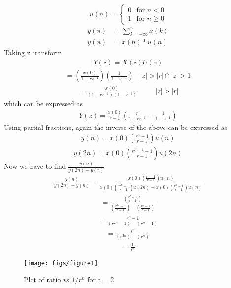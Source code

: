 \documentclass[journal,12pt,twocolumn]{IEEEtran}
\theoremstyle{remark}
\begin{document}
\[
u(n) = 
\begin{cases} 
0 & \text{for } n < 0 \\
1 & \text{for } n \geq 0 
\end{cases}
\]
\begin{align}
y(n) &= \sum_{k=-\infty}^{n} x(k) \\
y(n) &= x(n)*u(n)
\end{align}
Taking z transform
\begin{align}
Y(z) = X(z)U(z)
\end{align}
\begin{align}
= \left(\frac{x(0)}{1 - rz^{-1}}\right) \left(\frac{1}{1 - z^{-1}}\right)  \quad |z| > |r| \cap |z| > 1
\end{align}
\begin{align}
= \frac{x(0)}{(1 - rz^{-1})(1 - z^{-1})} && \quad |z| > |r|
\end{align}
which can be expressed as
\begin{align}
Y(z) = \frac{x(0)}{r-1} \left(\frac{r}{1-rz^{-1}} - \frac{1}{1-z^{-1}}\right)
\end{align}
Using partial fractions, again the inverse of the above can be expressed as 
\begin{align}
y(n) = x(0)\left(\frac{r^{n}-1}{r-1}\right)u(n)
\end{align}
\begin{align}
y(2n) = x(0)\left(\frac{r^{2n-1}-1}{r-1}\right)u(2n)
\end{align}
Now we have to find $\frac{y(n)}{y(2n)-y(n)}$
\begin{align}
\frac{y(n)}{y(2n)-y(n)} = \frac{x(0)\left(\frac{r^{n}-1}{r-1}\right)u(n)}{x(0)\left(\frac{r^{2n}-1}{r-1}\right)u(2n)- x(0)\left(\frac{r^{n}-1}{r-1}\right)u(n)}
\end{align}
\begin{align}
 = \frac{\left(\frac{r^{n}-1}{r-1}\right)}{\left(\frac{r^{2n}-1}{r-1}\right)- \left(\frac{r^{n}-1}{r-1}\right)}
\end{align}
\begin{align}
= \frac{r^{n}-1}{(r^{2n}-1)- (r^{n}-1)}
\end{align}
\begin{align}
= \frac{r^{n}}{(r^{2n})- (r^{n})}
\end{align}
\begin{align}
= \frac{1}{r^{n}}
\end{align}
\begin{figure}[!ht]
\centering
\begin{center}
\texttt{[image: figs/figure1]}
\caption{Plot of ratio vs $1/r^n$ for r = 2}
\end{center}
\end{figure}
\end{document}
